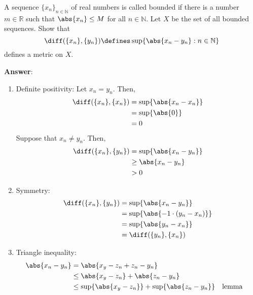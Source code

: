 \begin{exm}
	A sequence $\{x_n\}_{n\in\mathbb{N}}$ of real numbers is called bounded if there
	is a number $m\in\mathbb{R}$ such that $\abs{x_n}\leq M$ for all $n\in\mathbb{N}$.
	Let $X$ be the set of all bounded sequences. Show that
	\begin{equation*}
		\diff(\{x_n\},\{y_n\})\defines\sup\{\abs{x_n-y_n}:n\in\mathbb{N}\}
	\end{equation*}
	defines a metric on $X$.
	\begin{flushleft}
		\textbf{Answer}:
		\begin{enumerate}
			\item Definite positivity: Let $x_n=y_n$. Then,
			      \begin{align*}
				      \diff(\{x_n\},\{x_n\}) & = \sup\{\abs{x_n-x_n}\} \\
				                             & = \sup\{\abs{0}\}       \\
				                             & = 0
			      \end{align*}
			      Suppose that $x_n\neq y_n$. Then,
			      \begin{align*}
				      \diff(\{x_n\},\{y_n\}) & = \sup\{\abs{x_n-y_n}\} \\
				                             & \geq \abs{x_n-y_n}      \\
				                             & > 0
			      \end{align*}
			\item Symmetry:
			      \begin{align*}
				      \diff(\{x_n\},\{y_n\}) & = \sup\{\abs{x_n-y_n}\}          \\
				                             & = \sup\{\abs{-1\cdot(y_n-x_n)}\} \\
				                             & = \sup\{\abs{y_n-x_n}\}          \\
				                             & = \diff(\{y_n\},\{x_n\})
			      \end{align*}
			\item Triangle inequality:
			      \begin{align*}
				      \abs{x_n-y_n} & = \abs{x_y-z_n+z_n-y_n}                                              \\
				                    & \leq \abs{x_y-z_n} + \abs{z_n-y_n}                                   \\
				                    & \leq \sup\{\abs{x_y-z_n}\} + \sup\{\abs{z_n-y_n}\} &  & \text{lemma} \\

\end{align*}
\end{enumerate}
\end{flushleft}
\end{exm}

